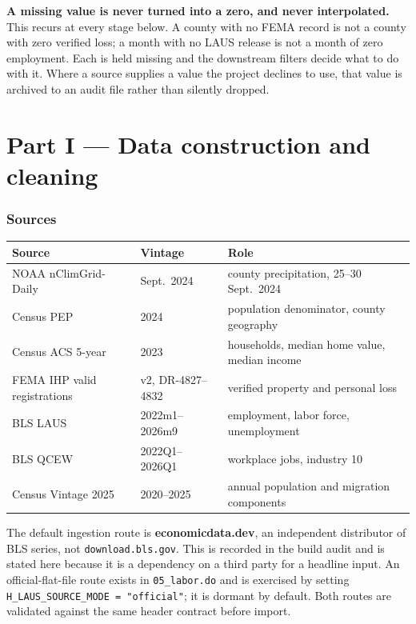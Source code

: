\documentclass[11pt,a4paper]{article}
\newcommand{\caution}[2]{\begin{tcolorbox}[warnbox,title={#1}]#2\end{tcolorbox}}
\newcommand{\notebx}[2]{\begin{tcolorbox}[notebox,title={#1}]#2\end{tcolorbox}}
\newcommand{\file}[1]{\texttt{\small #1}}
\begin{document}
\notebx{The single most important convention}{%
\textbf{A missing value is never turned into a zero, and never interpolated.}
This recurs at every stage below. A county with no FEMA record is not a county
with zero verified loss; a month with no LAUS release is not a month of zero
employment. Each is held missing and the downstream filters decide what to do
with it. Where a source supplies a value the project declines to use, that
value is archived to an audit file rather than silently dropped.}

\part*{Part I --- Data construction and cleaning}

\section{Sources}

\begin{center}
\small
\begin{tabular}{@{}llp{6.1cm}@{}}
\toprule
\textbf{Source} & \textbf{Vintage} & \textbf{Role} \\
\midrule
NOAA nClimGrid-Daily & Sept.\ 2024 & county precipitation, 25--30 Sept.\ 2024 \\
Census PEP           & 2024 & population denominator, county geography \\
Census ACS 5-year    & 2023 & households, median home value, median income \\
FEMA IHP valid registrations & v2, DR-4827--4832 & verified property and personal loss \\
BLS LAUS             & 2022m1--2026m9 & employment, labor force, unemployment \\
BLS QCEW             & 2022Q1--2026Q1 & workplace jobs, industry 10 \\
Census Vintage 2025  & 2020--2025 & annual population and migration components \\
\bottomrule
\end{tabular}
\end{center}

\caution{The LAUS route is not a direct BLS download}{%
The default ingestion route is \textbf{economicdata.dev}, an independent
distributor of BLS series, not \texttt{download.bls.gov}. This is recorded in
the build audit and is stated here because it is a dependency on a third party
for a headline input. An official-flat-file route exists in
\file{05\_labor.do} and is exercised by setting
\texttt{H\_LAUS\_SOURCE\_MODE = "official"}; it is dormant by default. Both
routes are validated against the same header contract before import.}
\end{document}
